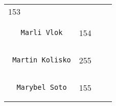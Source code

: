 \documentclass[]{article}
\begin{document}
\begin{longtable}[c]{@{}llll@{}}
\begin{minipage}[t]{0.10\columnwidth}
153
\end{minipage} & \begin{minipage}[t]{0.13\columnwidth}\raggedright
\end{minipage} & \begin{minipage}[t]{0.15\columnwidth}\raggedright
\end{minipage}
\\\noalign{\medskip}
\begin{minipage}[t]{0.39\columnwidth}\raggedright
\begin{verbatim}
   Marli Vlok
\end{verbatim}
\end{minipage} & \begin{minipage}[t]{0.10\columnwidth}\raggedright
154
\end{minipage} & \begin{minipage}[t]{0.13\columnwidth}\raggedright
\end{minipage} & \begin{minipage}[t]{0.15\columnwidth}\raggedright
\end{minipage}
\\\noalign{\medskip}
\begin{minipage}[t]{0.39\columnwidth}\raggedright
\begin{verbatim}
 Martin Kolisko
\end{verbatim}
\end{minipage} & \begin{minipage}[t]{0.10\columnwidth}\raggedright
255
\end{minipage} & \begin{minipage}[t]{0.13\columnwidth}\raggedright
\end{minipage} & \begin{minipage}[t]{0.15\columnwidth}\raggedright
\end{minipage}
\\\noalign{\medskip}
\begin{minipage}[t]{0.39\columnwidth}\raggedright
\begin{verbatim}
  Marybel Soto
\end{verbatim}
\end{minipage} & \begin{minipage}[t]{0.10\columnwidth}\raggedright
155
\end{minipage} & \begin{minipage}[t]{0.13\columnwidth}\raggedright
\end{minipage} & \begin{minipage}[t]{0.15\columnwidth}\raggedright

\end{minipage}
\end{longtable}
\end{document}
